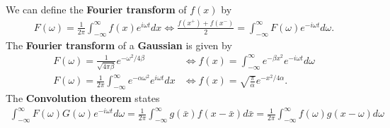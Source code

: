 We can define the \textbf{Fourier transform} of $f(x)$ \cite{bib:PDE book} by
\begin{align}
F(\omega) = \frac{1}{2\pi}\int_{-\infty}^{\infty} f(x)e^{i\omega t} dx \Longleftrightarrow \frac{f(x^+)+f(x^-)}{2} = \int_{-\infty}^{\infty} F(\omega) e^{-i\omega t} d\omega.
\end{align}
The \textbf{Fourier transform} of a \textbf{Gaussian} \cite{bib:PDE book} is given by
\begin{align}
F(\omega) = \frac{1}{\sqrt{4\pi\beta}}e^{-\omega^2/4\beta} &\Longleftrightarrow f(x) = \int_{-\infty}^{\infty} e^{-\beta x^2} e^{-i\omega t} d\omega \\
F(\omega) = \frac{1}{2\pi}\int_{-\infty}^{\infty} e^{-\alpha\omega^2}e^{i\omega t} dx &\Longleftrightarrow f(x) = \sqrt{\frac{\pi}{\alpha}}e^{-x^2/4\alpha}.
\end{align}
The \textbf{Convolution theorem} states
\begin{align}
\int_{-\infty}^{\infty} F(\omega)G(\omega) e^{-i\omega t} d\omega = \frac{1}{2\pi}\int_{-\infty}^{\infty} g(\bar{x})f(x-\bar{x}) d\bar{x}= \frac{1}{2\pi}\int_{-\infty}^{\infty} f(\omega)g(x-\omega) d\omega
\end{align}